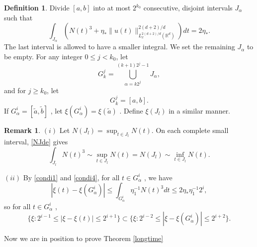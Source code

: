 \documentclass[reqno,11pt]{amsart}
\theoremstyle{plain}
\theoremstyle{definition}
\newtheorem{definition}[theorem]{Definition}
\newtheorem{remark}[theorem]{Remark}
\numberwithin{equation}{section}
\numberwithin{theorem}{section}
\def\geq{\geqslant}
\def\leq{\leqslant}
\def\R{\mathbb{R}}
\begin{document}
\begin{definition}
    Divide $[a,b]$ into at most $2^{k_0}$ consecutive, disjoint intervals $J_\alpha$ such that
\[\int_{J_\alpha} \left( N(t)^3 + \eta_{\ast} \|u(t)\|_{L_x^{2(d+2)/d}(\mathbb{R}^d)}^{2(d+2)/d} \right) dt = 2\eta_{\ast}. \]
The last interval is allowed to have a smaller integral. We set the remaining $J_\alpha$ to be empty.
For any integer $0 \leq j < k_0$, let
\begin{equation}\label{condi4}
 G_k^j = \bigcup_{\alpha=k2^j}^{(k+1)2^j-1} J_\alpha,    
\end{equation}
and for $ j \geq k_0 $, let
\[ G_k^j = [a, b]. \]
If $G_\alpha^i = [\tilde{a}, \tilde{b}]$ , let $\xi (G_\alpha^i) = \xi (\tilde{a})$ . Define $ \xi (J_l)$ in a similar manner.
\end{definition}
\begin{remark}
$(i)$ Let $N(J_l) = \sup_{t \in J_l} N(t)$. On each complete small interval, \eqref{NJde} gives
\[
\int_{J_l} N(t)^3 \sim \sup_{t \in J_l} N(t) = N(J_l) \sim \inf_{t \in J_l} N(t).
\]

$(ii)$ By \eqref{condi1} and \eqref{condi4}, for all $t \in G_\alpha^i$ , we have
\begin{equation}\label{condi5}
    |\xi (t) - \xi (G_\alpha^i)| \leq \int_{G_\alpha^i} \eta_1^{-1} N(t)^3 dt \leq 2\eta_{\ast} \eta_1^{-1} 2^i,
\end{equation}
so for all  $t \in G_\alpha^i$ ,
\[ \big\{\xi : 2^{i-1} \leq |\xi - \xi (t)| \leq 2^{i+1}\big\} \subset \big\{\xi : 2^{i-2} \leq |\xi - \xi (G_\alpha^i)| \leq 2^{i+2}\big\}.
\]
\end{remark}

Now we are in position to prove Theorem \ref{longtime}
\end{document}
